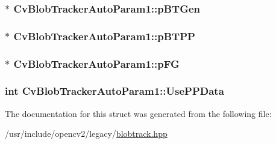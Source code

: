 \hypertarget{structCvBlobTrackerAutoParam1_a4f3a106b915850ccf97a06b5979305fc}{
\subsubsection[{p\-B\-T\-Gen}]{$\ast$ Cv\-Blob\-Tracker\-Auto\-Param1\-::p\-B\-T\-Gen}}\label{structCvBlobTrackerAutoParam1_a4f3a106b915850ccf97a06b5979305fc}
\hypertarget{structCvBlobTrackerAutoParam1_ae89784465f9f3e2f13f8ec36687c0242}{
\subsubsection[{p\-B\-T\-P\-P}]{$\ast$ Cv\-Blob\-Tracker\-Auto\-Param1\-::p\-B\-T\-P\-P}}\label{structCvBlobTrackerAutoParam1_ae89784465f9f3e2f13f8ec36687c0242}
\hypertarget{structCvBlobTrackerAutoParam1_a4d1016a283a075d2f08c9467be0d1cbc}{
\subsubsection[{p\-F\-G}]{$\ast$ Cv\-Blob\-Tracker\-Auto\-Param1\-::p\-F\-G}}\label{structCvBlobTrackerAutoParam1_a4d1016a283a075d2f08c9467be0d1cbc}
\hypertarget{structCvBlobTrackerAutoParam1_a0731cf94dda9b9f4af15db2bcab8130d}{
\subsubsection[{Use\-P\-P\-Data}]{\setlength{\rightskip}{0pt plus 5cm}int Cv\-Blob\-Tracker\-Auto\-Param1\-::\-Use\-P\-P\-Data}}\label{structCvBlobTrackerAutoParam1_a0731cf94dda9b9f4af15db2bcab8130d}


The documentation for this struct was generated from the following file\-:\begin{DoxyCompactItemize}
\item 
/usr/include/opencv2/legacy/\hyperlink{blobtrack_8hpp}{blobtrack.\-hpp}\end{DoxyCompactItemize}
